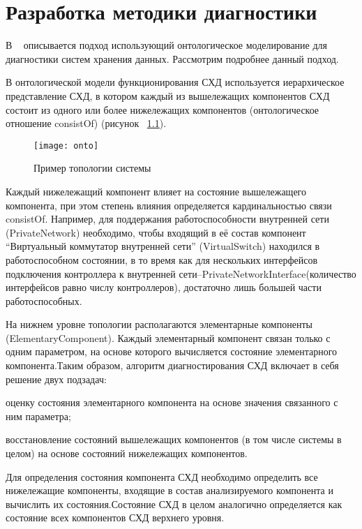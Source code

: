 

\begingroup
\renewcommand{\cleardoublepage}{}
\renewcommand{\clearpage}{}
\vspace{1em}
\chapter{Разработка методики диагностики}
\endgroup
В ~\cite{ontoapproach} описывается подход использующий онтологическое моделирование для диагностики систем хранения данных. Рассмотрим подробнее данный подход. 

В  онтологической  модели  функционирования СХД используется иерархическое представление СХД, в котором каждый из вышележащих компонентов СХД состоит из одного или более нижележащих компонентов (онтологическое отношение consistOf) (рисунок ~\ref{fig:onto}).
\begin{figure}[h]
	\centering
	\texttt{[image: onto]}
	\caption{Пример топологии системы}
	\label{fig:onto}
\end{figure}

Каждый нижележащий компонент влияет на  состояние  вышележащего  компонента,  при  этом  степень  влияния определяется кардинальностью связи consistOf. Например, для поддержания работоспособности внутренней сети (PrivateNetwork) необходимо,  чтобы входящий  в  её  состав  компонент “Виртуальный коммутатор  внутренней  сети”  (VirtualSwitch)  находился  в  работоспособном состоянии,  в  то  время  как  для  нескольких  интерфейсов  подключения контроллера  к  внутренней  сети–PrivateNetworkInterface(количество интерфейсов  равно  числу  контроллеров),  достаточно  лишь  большей  части работоспособных.

На нижнем  уровне  топологии  располагаются  элементарные компоненты  (ElementaryComponent).  Каждый  элементарный  компонент связан  только  с  одним  параметром,  на  основе  которого вычисляется состояние элементарного компонента.Таким  образом,  алгоритм  диагностирования СХД включает  в  себя решение двух подзадач:
\begin{itemize*}
	\item{оценку состояния  элементарного  компонента  на  основе  значения связанного с ним параметра;}
	\item{восстановление состояний вышележащих компонентов (в том числе системы в целом) на основе состояний нижележащих компонентов.}
\end{itemize*}
Для определения состояния компонента СХД необходимо определить все  нижележащие  компоненты,  входящие  в  состав  анализируемого компонента и вычислить их состояния.Состояние СХД в целом аналогично определяется как состояние всех компонентов СХД верхнего уровня.

